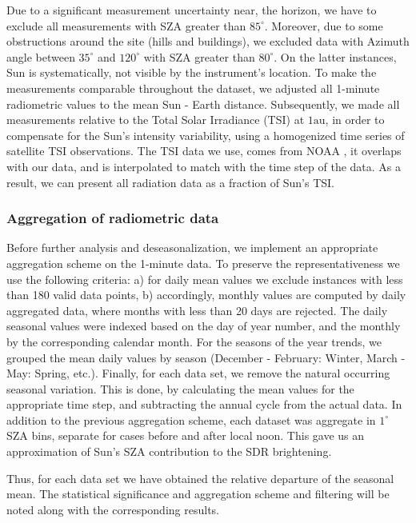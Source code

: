 \documentclass[preprint, 3p,
authoryear]{elsarticle} %
\begin{document}
Due to a significant measurement uncertainty near, the horizon, we have
to exclude all measurements with SZA greater than \(85^\circ\).
Moreover, due to some obstructions around the site (hills and
buildings), we excluded data with Azimuth angle between \(35^\circ\) and
\(120^\circ\) with SZA greater than \(80^\circ\). On the latter
instances, Sun is systematically, not visible by the instrument's
location. To make the measurements comparable throughout the dataset, we
adjusted all 1-minute radiometric values to the mean Sun - Earth
distance. Subsequently, we made all measurements relative to the Total
Solar Irradiance (TSI) at \(1 \text{au}\), in order to compensate for
the Sun's intensity variability, using a homogenized time series of
satellite TSI observations. The TSI data we use, comes from NOAA
\citep{Coddington2005}, it overlaps with our data, and is interpolated
to match with the time step of the data. As a result, we can present all
radiation data as a fraction of Sun's TSI.

\hypertarget{aggregation-of-radiometric-data}{%
\subsubsection{Aggregation of radiometric
data}\label{aggregation-of-radiometric-data}}

Before further analysis and deseasonalization, we implement an
appropriate aggregation scheme on the 1-minute data. To preserve the
representativeness we use the following criteria: a) for daily mean
values we exclude instances with less than 180 valid data points, b)
accordingly, monthly values are computed by daily aggregated data, where
months with less than 20 days are rejected. The daily seasonal values
were indexed based on the day of year number, and the monthly by the
corresponding calendar month. For the seasons of the year trends, we
grouped the mean daily values by season (December - February: Winter,
March - May: Spring, etc.). Finally, for each data set, we remove the
natural occurring seasonal variation. This is done, by calculating the
mean values for the appropriate time step, and subtracting the annual
cycle from the actual data. In addition to the previous aggregation
scheme, each dataset was aggregate in \(1^\circ\) SZA bins, separate for
cases before and after local noon. This gave us an approximation of
Sun's SZA contribution to the SDR brightening.

Thus, for each data set we have obtained the relative departure of the
seasonal mean. The statistical significance and aggregation scheme and
filtering will be noted along with the corresponding results.
\end{document}
